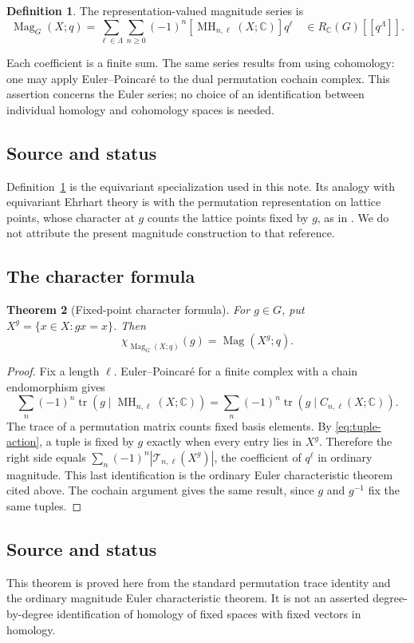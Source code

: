 \documentclass[11pt,a4paper]{article}
\numberwithin{equation}{section}
\newtheorem{theorem}{Theorem}[section]
\theoremstyle{definition}
\newtheorem{definition}[theorem]{Definition}
\theoremstyle{remark}
\newcommand{\C}{\mathbb C}
\newcommand{\G}{G}
\newcommand{\MH}{\operatorname{MH}}
\newcommand{\Mag}{\operatorname{Mag}}
\newcommand{\tr}{\operatorname{tr}}
\newcommand{\RC}{R_{\C}}
\newcommand{\source}{\subsection*{\color{darkblue}Source and status}}
\begin{document}
\begin{definition}\label{def:rep-mag}
 The representation-valued magnitude series is
 \begin{equation}\label{eq:rep-mag}
 \Mag_\G(X;q)=
 \sum_{\ell\in\Lambda}\sum_{n\geq0}
       (-1)^n[\MH_{n,\ell}(X;\C)]q^\ell
 \quad\in\RC(\G)[[q^\Lambda]].
 \end{equation}
\end{definition}
Each coefficient is a finite sum.  The same series results from using
cohomology: one may apply Euler--Poincar\'e to the dual permutation
cochain complex.  This assertion concerns the Euler series; no choice
of an identification between individual homology and cohomology spaces
is needed.

\source Definition~\ref{def:rep-mag} is the equivariant specialization
used in this note.  Its analogy with equivariant Ehrhart theory is with
the permutation representation on lattice points, whose character at
$g$ counts the lattice points fixed by $g$, as in
\cite[\S5, Lemma 5.2]{Stapledon}.  We do not attribute the present
magnitude construction to that reference.

\subsection{The character formula}

\begin{theorem}[Fixed-point character formula]\label{thm:character}
 For $g\in\G$, put $X^g=\{x\in X:gx=x\}$.  Then
 \begin{equation}\label{eq:character}
   \chi_{\Mag_\G(X;q)}(g)=\Mag(X^g;q).
 \end{equation}
\end{theorem}
\begin{proof}
Fix a length $\ell$.  Euler--Poincar\'e for a finite complex with a chain
endomorphism gives
\[
 \sum_n(-1)^n\tr(g\mid\MH_{n,\ell}(X;\C))
 =\sum_n(-1)^n\tr(g\mid C_{n,\ell}(X;\C)).
\]
The trace of a permutation matrix counts fixed basis elements.  By
\eqref{eq:tuple-action}, a tuple is fixed by $g$ exactly when every
entry lies in $X^g$.  Therefore the right side equals
$\sum_n(-1)^n|\mathcal T_{n,\ell}(X^g)|$, the coefficient of $q^\ell$
in ordinary magnitude.  This last identification is the ordinary Euler
characteristic theorem cited above.  The cochain argument gives the
same result, since $g$ and $g^{-1}$ fix the same tuples.
\end{proof}
\source This theorem is proved here from the standard permutation
trace identity and the ordinary magnitude Euler characteristic theorem.
It is not an asserted degree-by-degree identification of homology of
fixed spaces with fixed vectors in homology.
\end{document}
